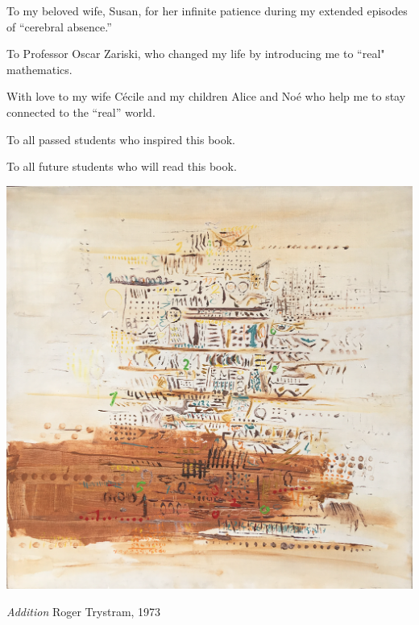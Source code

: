 %
%
%

\begin{dedication}
To my beloved wife, Susan, for her infinite patience during my extended episodes of ``cerebral absence.''

\smallskip

\noindent
To Professor Oscar Zariski, who changed my life by introducing me to ``real" mathematics.
\smallskip

\noindent
With love to my wife C\'ecile and my children Alice and No\'e who help me to stay connected to the ``real'' world. 
\bigskip

\noindent To all passed students who inspired this book.

\noindent To all future students who will read this book.
\end{dedication}

\vspace*{.25in}

\centerline{\includegraphics[scale=0.75]{AdditionForSpringer.png}}

\medskip

\centerline{{\large\em  Addition} \hspace*{4.5in} {\small Roger Trystram, 1973}}


